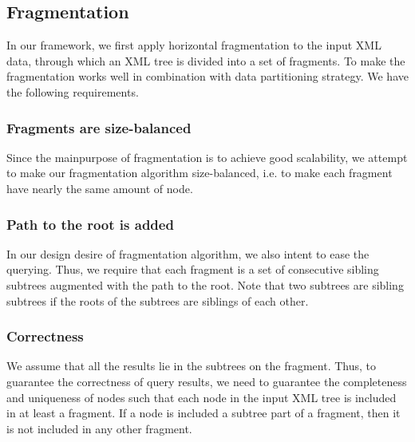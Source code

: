 \subsection{Fragmentation}

In our framework, we first apply horizontal fragmentation to the input XML data,
through which an XML tree is divided into a set of fragments. To make the 
fragmentation works well in combination with data partitioning strategy. We
have the following requirements.

\subsubsection{Fragments are size-balanced}

Since the mainpurpose of fragmentation is to achieve good scalability, we
attempt to make our fragmentation algorithm size-balanced, i.e. to make each
fragment have nearly the same amount of node. 

\subsubsection{Path to the root is added}

In our design desire of fragmentation algorithm, we also intent to ease the
querying. Thus, we require that each fragment is a set of consecutive
sibling subtrees augmented with the path to the root. Note that two
subtrees are sibling subtrees if the roots of the subtrees are siblings of each
other.

\subsubsection{Correctness}

We assume that all the results lie in the subtrees on the fragment. Thus,
to guarantee the correctness of query results, we need to guarantee the
completeness and uniqueness of nodes such that each node in the input XML tree
is included in at least a fragment. If a node is included a subtree part of a
fragment, then it is not included in any other fragment.


